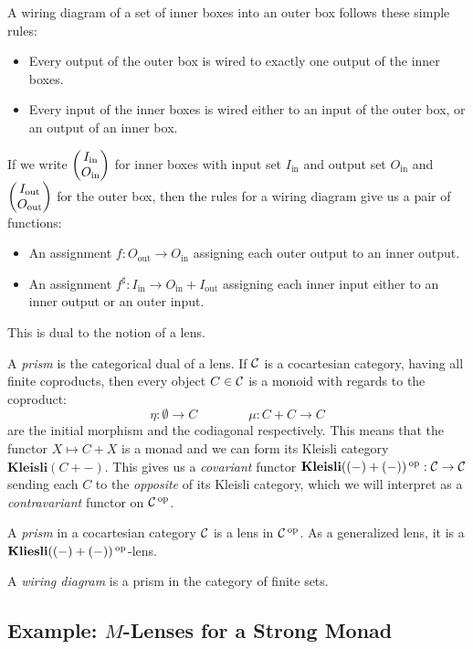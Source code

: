 A wiring diagram of a set of inner boxes into an outer box follows these simple rules:
\begin{itemize}
\item Every output of the outer box is wired to exactly one output of the inner
  boxes.
  \item Every input of the inner boxes is wired either to an input of the outer
    box, or an output of an inner box.
\end{itemize}

If we write $\begin{pmatrix}{I_{\text{in}}} \\ {O_{\text{in}}} \end{pmatrix}$ for inner boxes with input set
$I_{\text{in}}$ and output set $O_{\text{in}}$ and
$\begin{pmatrix}{I_{\text{out}}} \\ {O_{\text{out}}} \end{pmatrix}$ for the outer box, then the rules for a
wiring diagram give us a pair of functions:
\begin{itemize}
\item An assignment $f : O_{\text{out}} \to O_{\text{in}}$ assigning each outer
  output to an inner output.
\item An assignment $f^{\sharp} : I_{\text{in}} \to O_{\text{in}} +
  I_{\text{out}}$ assigning each inner input either to an inner output or an
  outer input.
\end{itemize}

This is dual to the notion of a lens.

A \emph{prism} is the categorical dual of a lens. If $\operatorname{\mathcal{C}}$ is a cocartesian
category, having all finite coproducts, then every object $C \in \operatorname{\mathcal{C}}$ is a
monoid with regards to the coproduct:
$$\eta : \emptyset \to C \quad\quad\quad\quad \mu : C + C \to C$$
are the initial morphism and the codiagonal respectively. This means that the
functor $X \mapsto C + X$ is a monad and we can form its Kleisli category
$\textbf{Kleisli}(C + -)$. This gives us a \emph{covariant} functor
$\textbf{Kleisli}((-) + (-))\operatorname{^\text{op}} : \operatorname{\mathcal{C}} \to \operatorname{\mathcal{C}}$ sending each $C$ to the
\emph{opposite} of its Kleisli category, which we will interpret as a
\emph{contravariant} functor on $\operatorname{\mathcal{C}}\operatorname{^\text{op}}$. 

\begin{defn}
A \emph{prism} in a cocartesian category $\operatorname{\mathcal{C}}$ is a lens in $\operatorname{\mathcal{C}}\operatorname{^\text{op}}$. As a
generalized lens, it is a $\textbf{Kliesli}((-) + (-))\operatorname{^\text{op}}$-lens.

A \emph{wiring diagram} is a prism in the category of finite sets.
\end{defn}

\subsection{Example: $M$-Lenses for a Strong Monad}

